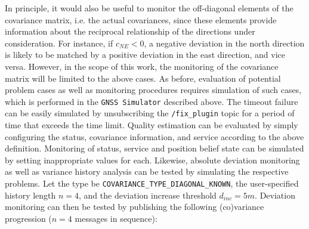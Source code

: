 \documentclass[english, master, utf8]{base/thesis_KBS}
\newcommand{\code}[1]{\colorbox{light-gray}{\texttt{#1}}}
\begin{document}
In principle, it would also be useful to monitor the off-diagonal elements of the covariance matrix, i.e. the actual covariances, since these elements provide information about the
reciprocal relationship of the directions under consideration. For instance, if $c_{NE} < 0$, a negative deviation in the north direction is likely to be matched by a positive deviation in
the east direction, and vice versa. However, in the scope of this work, the monitoring of the covariance matrix will be limited to the above cases.\newline
As before, evaluation of potential problem cases as well as monitoring procedures requires simulation of such cases, which is performed in the \code{GNSS Simulator} described above.
The timeout failure can be easily simulated by unsubscribing the \code{/fix\_plugin} topic for a period of time that exceeds the time limit. Quality estimation can be evaluated by
simply configuring the status, covariance information, and service according to the above definition. Monitoring of status, service and position belief state can be simulated by
setting inappropriate values for each. Likewise, absolute deviation monitoring as well as variance history analysis can be tested by simulating the respective problems.
Let the type be \code{COVARIANCE\_TYPE\_DIAGONAL\_KNOWN}, the user-specified history length $n = 4$, and the deviation increase threshold $d_{inc} = 5 m$. Deviation monitoring
can then be tested by publishing the following (co)variance progression ($n = 4$ messages in sequence):
\end{document}
